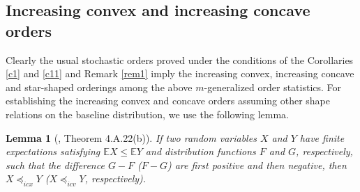 \documentclass [11pt]{article}
\newtheorem{lemma}{Lemma}
\begin{document}
\subsection{Increasing convex and increasing concave orders}

Clearly the usual stochastic orders proved under the conditions of the Corollaries \ref{c1} and \ref{c11} and Remark \ref{rem1}
imply the increasing convex, increasing concave and star-shaped orderings among the above $m$-generalized order statistics. For establishing the increasing convex and concave orders assuming other shape relations on the baseline distribution, we use the following lemma.

\begin{lemma}[\cite{shaked2007}, Theorem 4.A.22(b)] \label{l0}
If two random variables $X$ and $Y$ have finite expectations satisfying $\mathbb{E}X \leq\mathbb{E}Y$ and distribution functions $F$ and $G$, respectively,
such that the difference $G-F$ ($F-G$) are first positive and then negative, then $X \preceq_{icx} Y$ ($X \preceq_{icv} Y$, respectively).
\end{lemma}
\end{document}
